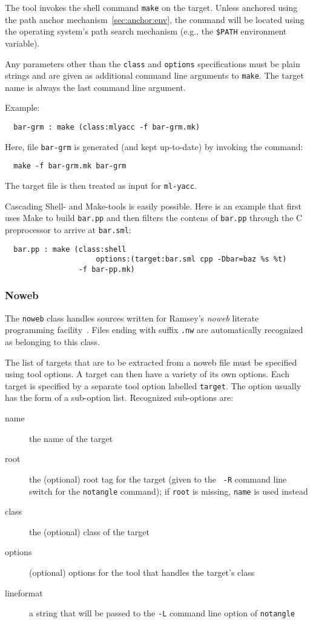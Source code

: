 \documentclass[titlepage,letterpaper]{article}
\begin{document}
The tool invokes the shell command {\tt make} on the target.  Unless
anchored using the path anchor mechanism~\ref{sec:anchor:env}, the
command will be located using the operating system's path search
mechanism (e.g., the {\tt \$PATH} environment variable).

Any parameters other than the {\tt class} and {\tt options}
specifications must be plain strings and are given as additional
command line arguments to {\tt make}.  The target name is always the
last command line argument.

Example:

\begin{verbatim}
  bar-grm : make (class:mlyacc -f bar-grm.mk)
\end{verbatim}

Here, file {\tt bar-grm} is generated (and kept up-to-date) by
invoking the command:
\begin{verbatim}
  make -f bar-grm.mk bar-grm
\end{verbatim}
\noindent The target file is then treated as input for {\tt ml-yacc}.

Cascading Shell- and Make-tools is easily possible.  Here is an
example that first uses Make to build {\tt bar.pp} and then filters
the contens of {\tt bar.pp} through the C preprocessor to arrive at
{\tt bar.sml}:

\begin{verbatim}
  bar.pp : make (class:shell
                     options:(target:bar.sml cpp -Dbar=baz %s %t)
                 -f bar-pp.mk)
\end{verbatim}

\subsubsection*{Noweb}

The {\tt noweb} class handles sources written for Ramsey's {\it noweb}
literate programming facility~\cite{ramsey:simplified}.  Files ending
with suffix {\tt .nw} are automatically recognized as belonging to
this class.

The list of targets that are to be extracted from a noweb file must be
specified using tool options.  A target can then have a variety of its
own options.  Each target is specified by a separate tool option
labelled {\tt target}.  The option usually has the form of a
sub-option list.  Recognized sub-options are:

\begin{description}
\item[name] the name of the target
\item[root] the (optional) root tag for the target (given to the {\tt
-R} command line switch for the {\tt notangle} command); if {\tt root}
is missing, {\tt name} is used instead
\item[class] the (optional) class of the target
\item[options] (optional) options for the tool that handles the
target's class
\item[lineformat] a string that will be passed to the {\tt -L} command
line option of {\tt notangle}
\end{description}
\end{document}
